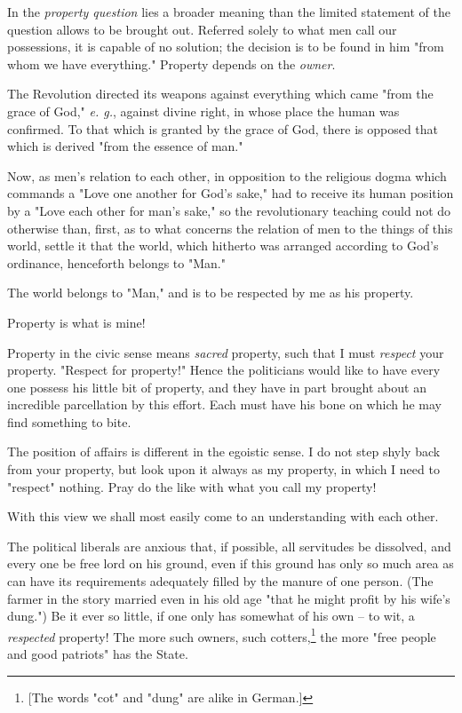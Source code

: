\documentclass[a4paper]{book}
\begin{document}
In the \textit{property question} lies a broader meaning than the limited 
statement of the question allows to be brought out. Referred solely to what 
men call our possessions, it is capable of no solution; the decision is to be 
found in him "{}from whom we have everything."{} Property depends on the 
\textit{owner}.

The Revolution directed its weapons against everything which came "{}from the 
grace of God,"{} \textit{e. g.}, against divine right, in whose place the 
human was confirmed. To that which is granted by the grace of God, there is 
opposed that which is derived "{}from the essence of man."{}

Now, as men's relation to each other, in opposition to the religious dogma 
which commands a "{}Love one another for God's sake,"{} had to receive its 
human position by a "{}Love each other for man's sake,"{} so the revolutionary 
teaching could not do otherwise than, first, as to what concerns the relation 
of men to the things of this world, settle it that the world, which hitherto 
was arranged according to God's ordinance, henceforth belongs to "{}Man."{}

The world belongs to "{}Man,"{} and is to be respected by me as his property.

Property is what is mine!

Property in the civic sense means \textit{sacred} property, such that I must 
\textit{respect} your property. "{}Respect for property!"{} Hence the 
politicians would like to have every one possess his little bit of property, 
and they have in part brought about an incredible parcellation by this effort. 
Each must have his bone on which he may find something to bite.

The position of affairs is different in the egoistic sense. I do not step 
shyly back from your property, but look upon it always as my property, in 
which I need to "{}respect"{} nothing. Pray do the like with what you call my 
property!

With this view we shall most easily come to an understanding with each other.

The political liberals are anxious that, if possible, all servitudes be 
dissolved, and every one be free lord on his ground, even if this ground has 
only so much area as can have its requirements adequately filled by the manure 
of one person. (The farmer in the story married even in his old age "{}that he 
might profit by his wife's dung."{}) Be it ever so little, if one only has 
somewhat of his own -- to wit, a \textit{respected} property! The more such 
owners, such cotters,\footnote{[The words "{}cot"{} and "{}dung"{} are alike 
in German.]} the more "{}free people and good patriots"{} has the State.
\end{document}
